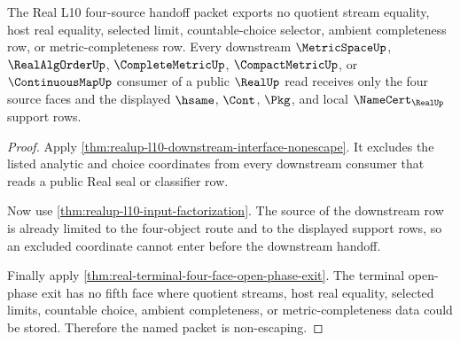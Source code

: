 \begin{theorem}
\label{thm:real-l10-four-source-handoff-nonescape}
The Real L10 four-source handoff packet exports no quotient stream equality, host real equality, selected limit, countable-choice selector, ambient completeness row, or metric-completeness row. Every downstream $\MetricSpaceUp$, $\RealAlgOrderUp$, $\CompleteMetricUp$, $\CompactMetricUp$, or $\ContinuousMapUp$ consumer of a public $\RealUp$ read receives only the four source faces and the displayed $\hsame$, $\Cont$, $\Pkg$, and local $\NameCert_{\RealUp}$ support rows.
\end{theorem}
\begin{proof}
Apply \autoref{thm:realup-l10-downstream-interface-nonescape}. It excludes the listed analytic and choice coordinates from every downstream consumer that reads a public Real seal or classifier row.

Now use \autoref{thm:realup-l10-input-factorization}. The source of the downstream row is already limited to the four-object route and to the displayed support rows, so an excluded coordinate cannot enter before the downstream handoff.

Finally apply \autoref{thm:real-terminal-four-face-open-phase-exit}. The terminal open-phase exit has no fifth face where quotient streams, host real equality, selected limits, countable choice, ambient completeness, or metric-completeness data could be stored. Therefore the named packet is non-escaping.
\end{proof}

